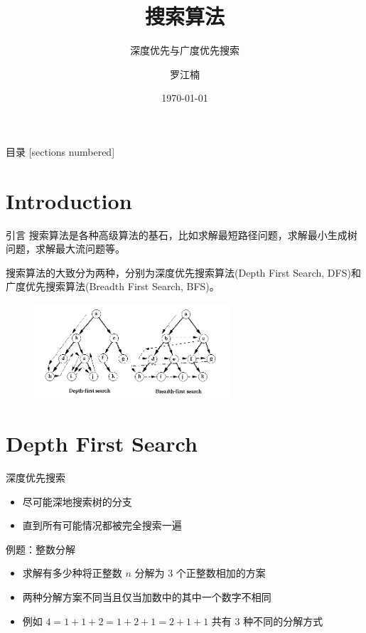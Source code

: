 \documentclass[12pt,aspectratio=169]{beamer}
\title{搜索算法}
\subtitle{深度优先与广度优先搜索}
\date{\today}
\author{罗江楠}
\institute{哈尔滨工业大学（威海）}
\begin{document}
\maketitle

\begin{frame}{目录}
  [sections numbered]
  \tableofcontents[hideallsubsections]
\end{frame}

\section[引言]{Introduction}

\begin{frame}[fragile]{引言}
  搜索算法是各种高级算法的基石，比如求解最短路径问题，求解最小生成树问题，求解最大流问题等。

  搜索算法的大致分为两种，分别为深度优先搜索算法(Depth First Search, DFS)和广度优先搜索算法(Breadth First Search, BFS)。

  \begin{figure}
    \includegraphics[height=100pt]{dfsbfs.png}
  \end{figure}
\end{frame}

\section[深度优先搜索]{Depth First Search}

\begin{frame}[fragile]{深度优先搜索}
  \begin{itemize}
    \item 尽可能深地搜索树的分支
    \item 直到所有可能情况都被完全搜索一遍
  \end{itemize}
\end{frame}

\begin{frame}[fragile]{例题：整数分解}
  \begin{itemize}
    \item 求解有多少种将正整数 $n$ 分解为 $3$ 个正整数相加的方案
    \item 两种分解方案不同当且仅当加数中的其中一个数字不相同
    \item 例如 $4=1+1+2=1+2+1=2+1+1$ 共有 $3$ 种不同的分解方式
  \end{itemize}
\end{frame}
\end{document}
